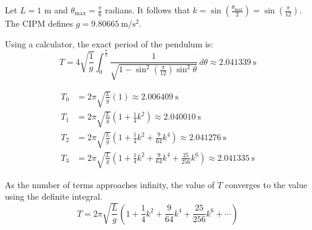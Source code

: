 \documentclass[preview]{standalone}
\begin{document}
\color{white}

Let $L = 1$ m and $\theta_{\mathrm{max}} = \frac{\pi}{6}$ radians. It follows that $k = \sin\left(\frac{\theta_{\mathrm{max}}}{2}\right) = \sin\left(\frac{\pi}{12}\right)$. The CIPM defines $g = \SI{9.80665}{\meter/\second\squared}$.

Using a calculator, the exact period of the pendulum is:
\[
  T = 4\sqrt{\frac{1}{g}} \int_{0}^{\frac{\pi}{2}} \frac{1}{\sqrt{1 - \sin^2\left(\frac{\pi}{12}\right) \sin^2 \theta}} \, d\theta \approx \boxed{\SI{2.041339}{\second}}
\]

\begin{align*}
    T_0 &= 2\pi \sqrt{\frac{L}{g}} \left(1\right) \approx \boxed{\SI{2.006409}{\second}} \\
    T_1 &= 2\pi \sqrt{\frac{L}{g}} \left(1 + \frac{1}{4}k^2\right) \approx \boxed{\SI{2.040010}{\second}} \\
    T_2 &= 2\pi \sqrt{\frac{L}{g}} \left(1 + \frac{1}{4}k^2 + \frac{9}{64}k^4\right) \approx \boxed{\SI{2.041276}{\second}} \\
    T_3 &= 2\pi \sqrt{\frac{L}{g}} \left(1 + \frac{1}{4}k^2 + \frac{9}{64}k^4 + \frac{25}{256}k^6\right) \approx \boxed{\SI{2.041335}{\second}}
\end{align*}

As the number of terms approaches infinity, the value of $T$ converges to the value using the definite integral.
\[
  T = 2\pi \sqrt{\frac{L}{g}} \left(1 + \frac{1}{4}k^2 + \frac{9}{64}k^4 + \frac{25}{256}k^6 + \cdots\right)
\]
\end{document}
